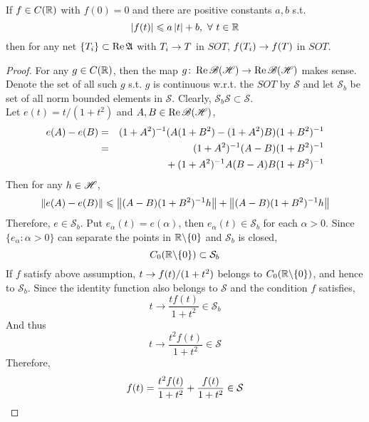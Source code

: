 \begin{lem}
	If $f \in C(\mathbb{R})$ with $f(0)=0$ and there are positive constants $a,b$ s.t. 
	\begin{equation*}
		\left\lvert f(t)\right\lvert \leqslant a\left\lvert t\right\lvert + b,~ \forall~ t \in \mathbb{R}
	\end{equation*}
	then for any net $\{T_i\} \subset \operatorname{Re}{\mathfrak{A}}$ with $T_i \rightarrow T$ in $SOT$, $f(T_i) \rightarrow f(T)$ in $SOT$.
\end{lem}
\begin{proof}
	For any $g \in C(\mathbb{R})$, then the map $g \colon \operatorname{Re}{\mathscr{B(H)}} \rightarrow \operatorname{Re}{\mathscr{B(H)}}$ makes sense. Denote the set of all such $g$ s.t. $g$ is continuous w.r.t. the $SOT$ by $\mathcal{S}$ and let $\mathcal{S}_b$ be set of all norm bounded elements in $\mathcal{S}$. Clearly, $\mathcal{S}_b \mathcal{S} \subset \mathcal{S}$.\\
	Let $e(t) = t / (1+t^2)$ and $A,B \in \operatorname{Re}{\mathscr{B(H)}}$,
	\begin{eqnarray*}
		e(A)-e(B) &=& (1+A^2)^{-1}(A(1+B^2)-(1+A^2)B)(1+B^2)^{-1} \\
		&=& (1+A^2)^{-1}(A-B)(1+B^2)^{-1} \\
		&& \negmedspace{} + (1+A^2)^{-1}A(B-A)B(1+B^2)^{-1}
	\end{eqnarray*}
	Then for any $h \in \mathscr{H}$,
	\begin{equation*}
		\left\lVert e(A)-e(B)\right\lVert \leqslant \left\lVert(A-B)(1+B^2)^{-1}h\right\lVert + \left\lVert(A-B)(1+B^2)^{-1}h\right\lVert
	\end{equation*}
	Therefore, $e \in \mathcal{S}_b$. Put $e_{\alpha}(t) = e(\alpha)$, then $e_{\alpha}(t) \in \mathcal{S}_b$ for each $\alpha > 0$. Since $\{e_{\alpha} \colon \alpha > 0\}$ can separate the points in $\mathbb{R} \backslash \{0\}$ and $\mathcal{S}_b$ is closed,
	\begin{equation*}
		C_0(\mathbb{R} \backslash \{0\}) \subset \mathcal{S}_b
	\end{equation*}
	If $f$ satisfy above assumption, $t \rightarrow f(t) / (1+t^2)$ belongs to $C_0(\mathbb{R} \backslash \{0\})$, and hence to $\mathcal{S}_b$. Since the identity function also belongs to $\mathcal{S}$ and the condition $f$ satisfies,
	\begin{equation*}
		t \longrightarrow \frac{tf(t)}{1+t^2} \in \mathcal{S}_b
	\end{equation*}
	And thus 
	\begin{equation*}
		t \longrightarrow \frac{t^2f(t)}{1+t^2} \in \mathcal{S}
	\end{equation*}
	Therefore,
	\begin{equation*}
		f(t) = \frac{t^2f(t)}{1+t^2} + \frac{f(t)}{1+t^2} \in \mathcal{S} \qedhere
	\end{equation*}
\end{proof}

